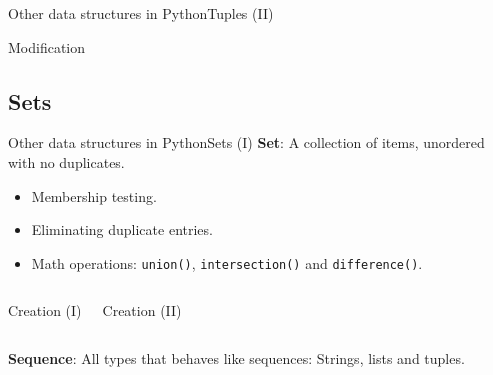 \documentclass[10pt,compress]{beamer} %
\begin{document}
\begin{frame}{Other data structures in Python}{Tuples (II)}
 	  \vspace{-0.2cm}
 	   \tiny{
		\begin{block}{\scriptsize{Modification}}
		
		\vspace{-0.2cm}
		
		\vspace{-0.2cm}
		
		\end{block}
   }
\end{frame}

\subsection{Sets}
\begin{frame}{Other data structures in Python}{Sets (I)}
\vspace{-0.2cm}
	\textbf{Set}: A collection of items, unordered with no duplicates.
		\begin{itemize}
		\item \small{Membership testing.}
		\item \small{Eliminating duplicate entries.}
		\item \small{Math operations: \texttt{union()}, \texttt{intersection()} and \texttt{difference()}.}
		\end{itemize}
\vspace{-0.2cm}
    \begin{columns}
 	   \scriptsize{
		\begin{block}{Creation (I)}
		\vspace{-0.2cm}
		
		
		\vspace{-0.2cm}
		\end{block}
		}
		

 	  \scriptsize{
 	   \begin{block}{Creation (II)}
		\vspace{-0.2cm}
		
		
		\vspace{-0.2cm}
		
		\end{block}
		\vspace{0.3cm}
		}
	\end{columns}
	\vspace{0.1cm}
\small{\textbf{Sequence}: All types that behaves like sequences: Strings, lists and tuples.}


\end{frame}
\end{document}
